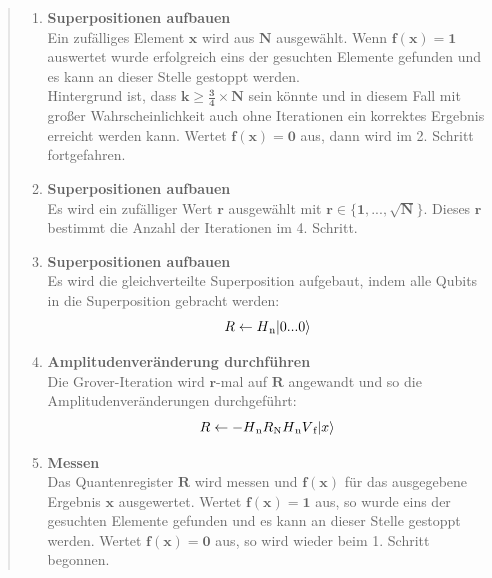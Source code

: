 \begin{quote}
    \begin{enumerate}
        \item \textbf{Superpositionen aufbauen}
        \\
        Ein zufälliges Element $\mathbf{x}$ wird aus $\mathbf{N}$ ausgewählt. Wenn $\mathbf{f(x) = 1}$ auswertet wurde erfolgreich eins der gesuchten Elemente gefunden und es kann an dieser Stelle gestoppt werden. 
        \\
        Hintergrund ist, dass $\mathbf{k \geq \frac{3}{4} \times N}$ sein könnte und in diesem Fall mit großer Wahrscheinlichkeit auch ohne Iterationen ein korrektes Ergebnis erreicht werden kann. Wertet $\mathbf{f(x) = 0}$ aus, dann wird im 2. Schritt fortgefahren.
        \item \textbf{Superpositionen aufbauen}
        \\
        Es wird ein zufälliger Wert $\mathbf{r}$ ausgewählt mit $\mathbf{r \in \{ 1, ..., \sqrt{N} \}}$. Dieses $\mathbf{r}$ bestimmt die Anzahl der Iterationen im 4. Schritt.
        \item \textbf{Superpositionen aufbauen}
        \\
        Es wird die gleichverteilte Superposition aufgebaut, indem alle Qubits in die Superposition gebracht werden:
        \begin{equation}
            R \leftarrow H\textsubscript{n} |0 ... 0\rangle 
        \end{equation}
        \item \textbf{Amplitudenveränderung durchführen}
        \\
        Die Grover-Iteration wird $\mathbf{r}$-mal auf $\mathbf{R}$ angewandt und so die Amplitudenveränderungen durchgeführt:
        \begin{equation}
            R \leftarrow -H\textsubscript{n} R\textsubscript{N} H\textsubscript{n} V\textsubscript{f} |x\rangle
        \end{equation}
        \item \textbf{Messen}
        \\
        Das Quantenregister $\mathbf{R}$ wird messen und $\mathbf{f(x)}$ für das ausgegebene Ergebnis $\mathbf{x}$ ausgewertet. Wertet $\mathbf{f(x) = 1}$ aus, so wurde eins der gesuchten Elemente gefunden und es kann an dieser Stelle gestoppt werden. Wertet $\mathbf{f(x) = 0}$ aus, so wird wieder beim 1. Schritt begonnen.
    \end{enumerate}
\end{quote}

